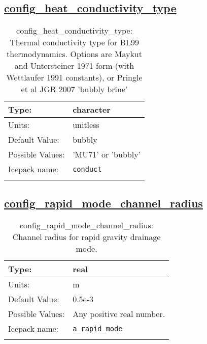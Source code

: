 \subsection[config\_heat\_conductivity\_type]{\hyperref[sec:nm_tab_thermodynamics]{config\_heat\_conductivity\_type}}
\label{subsec:nm_sec_config_heat_conductivity_type}
\begin{center}
\begin{longtable}{| p{2.0in} || p{4.0in} |}
    \hline
    Type: & character \\
    \hline
    Units: & \si{unitless} \\
    \hline
    Default Value: & bubbly \\
    \hline
    Possible Values: & 'MU71' or 'bubbly' \\
    \hline
    \hline
    Icepack name: & \verb+conduct+ \\
    \caption{config\_heat\_conductivity\_type: Thermal conductivity type for BL99 thermodynamics. Options are Maykut and Untersteiner 1971 form (with Wettlaufer 1991 constants), or Pringle et al JGR 2007 'bubbly brine'}
\end{longtable}
\end{center}
\subsection[config\_rapid\_mode\_channel\_radius]{\hyperref[sec:nm_tab_thermodynamics]{config\_rapid\_mode\_channel\_radius}}
\label{subsec:nm_sec_config_rapid_mode_channel_radius}
\begin{center}
\begin{longtable}{| p{2.0in} || p{4.0in} |}
    \hline
    Type: & real \\
    \hline
    Units: & \si{m} \\
    \hline
    Default Value: & 0.5e-3 \\
    \hline
    Possible Values: & Any positive real number. \\
    \hline
    \hline
    Icepack name: & \verb+a_rapid_mode+ \\
    \caption{config\_rapid\_mode\_channel\_radius: Channel radius for rapid gravity drainage mode.}
\end{longtable}
\end{center}
